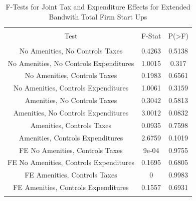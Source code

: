 \documentclass[12pt,a4paper]{article}
\begin{document}
\begin{table}[!htbp] \centering 
  \caption{F-Tests for Joint Tax and Expenditure Effects for Extended Bandwith Total Firm Start Ups} 
  \label{--Ftests} 
\begin{tabular}{@{\extracolsep{5pt}} ccc} 
\\[-1.8ex]\hline 
\hline \\[-1.8ex] 
Test & F-Stat & P(\textgreater F) \\ 
\hline \\[-1.8ex] 
No Amenities, No Controls Taxes & 0.4263 & 0.5138 \\ 
No Amenities, No Controls Expenditures & 1.0015 & 0.317 \\ 
No Amenities, Controls Taxes & 0.1983 & 0.6561 \\ 
No Amenities, Controls Expenditures & 1.0061 & 0.3159 \\ 
Amenities, No Controls Taxes & 0.3042 & 0.5813 \\ 
Amenities, No Controls Expenditures & 3.0012 & 0.0832 \\ 
Amenities, Controls Taxes & 0.0935 & 0.7598 \\ 
Amenities, Controls Expenditures & 2.6759 & 0.1019 \\ 
FE No Amenities, Controls Taxes & 9e-04 & 0.9755 \\ 
FE No Amenities, Controls Expenditures & 0.1695 & 0.6805 \\ 
FE Amenities, Controls Taxes & 0 & 0.9983 \\ 
FE Amenities, Controls Expenditures & 0.1557 & 0.6931 \\ 
\hline \\[-1.8ex] 
\end{tabular} 
\end{table} 
\end{document}
